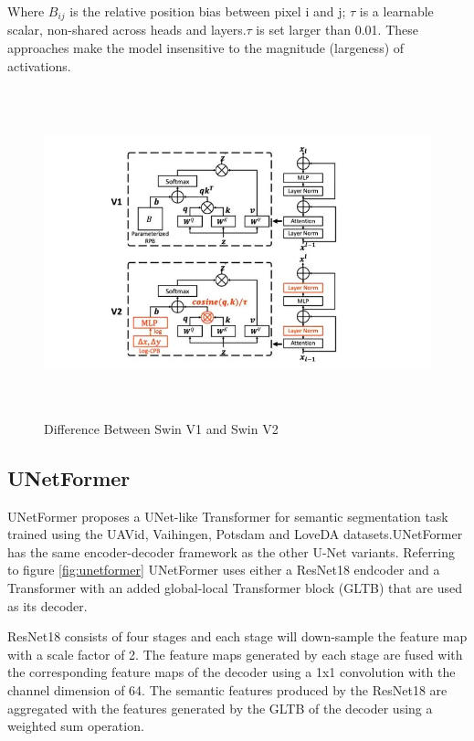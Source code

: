 Where $B_{ij}$ is the relative position bias between pixel i and j; $\tau$ is a learnable scalar, non-shared across heads and layers.$\tau$ is set larger than 0.01. These approaches make the model insensitive to the magnitude (largeness) of activations.
\FloatBarrier
\begin{figure}[ht]
\includegraphics[width=13.5cm, height=9.5cm]{images/swin1-vs-swin2.jpg}
\centering
\caption{Difference Between Swin V1 and Swin V2 \protect\cite{swin-v2}}
\label{fig:swin v1 vs v2}
\end{figure}
\FloatBarrier

\subsection{UNetFormer}
UNetFormer \cite{unetformer} proposes a UNet-like Transformer for semantic segmentation task trained using the UAVid, Vaihingen, Potsdam and LoveDA datasets.UNetFormer has the same encoder-decoder framework as the other U-Net variants. Referring to figure \ref{fig:unetformer} UNetFormer uses either a ResNet18 endcoder and a Transformer with an added global-local Transformer block (GLTB) that are used as its decoder. 

ResNet18 consists of four stages and each stage will down-sample the feature map with a scale factor of 2. The feature maps generated by each stage are fused with the corresponding feature maps of the decoder using a 1x1 convolution with the channel dimension of 64. The semantic features produced by the ResNet18 are aggregated with the features generated by the GLTB of the decoder using a weighted sum operation. 


